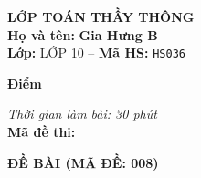 \noindent
\begin{tcolorbox}[colback=white,colframe=black,arc=0mm,boxrule=0.8pt,top=4pt,bottom=4pt,left=6pt,right=6pt]
	\begin{minipage}[c]{0.44\textwidth}
		{\bfseries\large LỚP TOÁN THẦY THÔNG}\\[3pt]
		\textbf{Họ và tên:} \textbf{\large Gia Hưng B}\\[3pt]
		\textbf{Lớp:} LỚP 10 \quad -- \quad \textbf{Mã HS:} \texttt{HS036}
	\end{minipage}
	\hfill
	\begin{minipage}[c]{0.22\textwidth}
		\begin{tcolorbox}[colback=white,colframe=black,arc=0mm,boxrule=0.6pt,height=1.8cm,halign=center,valign=top,top=2pt]
			{\bfseries\normalsize Điểm}
		\end{tcolorbox}
	\end{minipage}
	\hfill
	\begin{minipage}[c]{0.30\textwidth}
		\raggedleft
		\textit{Thời gian làm bài: 30 phút}\\[4pt]
		\textbf{Mã đề thi:} 
	\end{minipage}
\end{tcolorbox}
\vspace{0.25cm}

\noindent\textbf{\large ĐỀ BÀI (MÃ ĐỀ: 008)}
\vspace{0.1cm}

